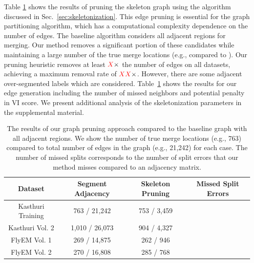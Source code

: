 Table \ref{table:skeletonization} shows the results of pruning the skeleton graph using the algorithm discussed in Sec.~\ref{sec:skeletonization}. 
This edge pruning is essential for the graph partitioning algorithm, which has a computational complexity dependence on the number of edges. 
The baseline algorithm considers all adjacent regions for merging. 
Our method removes a significant portion of these candidates while maintaining a large number of the true merge locations (e.g.,  compared to ). 
Our pruning heuristic removes at least $\textcolor{red}{X}\times$ the number of edges on all datasets, achieving a maximum removal rate of $\textcolor{red}{XX}\times$.
However, there are some adjacent over-segmented labels which are considered. 
Table~\ref{table:skeletonization} shows the results for our edge generation including the number of missed neighbors and potential penalty in VI score.
We present additional analysis of the skeletonization parameters in the supplemental material.

\begin{table}
	\centering
	\small
	\begin{tabular}{c c c c} \hline
		\textbf{Dataset} & \textbf{Segment Adjacency} & \textbf{Skeleton Pruning} & \textbf{Missed Split Errors} \\ \hline
		Kasthuri Training & 763 / 21,242 & 753 / 3,459 & \\
		Kasthuri Vol. 2 & 1,010 / 26,073 & 904 / 4,327 & \\
		FlyEM Vol. 1 & 269 / 14,875 & 262 / 946 & \\
		FlyEM Vol. 2 & 270 / 16,808 & 285 / 768 & \\ \hline
	\end{tabular}
	\caption{The results of our graph pruning approach compared to the baseline graph with all adjacent regions. We show the number of true merge locations (e.g., 763) compared to total number of edges in the graph (e.g., 21,242) for each case. The number of missed splits corresponds to the number of split errors that our method misses compared to an adjacency matrix.}
	\label{table:skeletonization}
\end{table}

